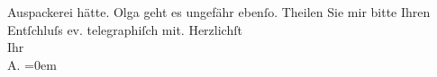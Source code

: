 \begin{ledgroupsized}[t]{13cm}
               Auspackerei hätte. Olga geht es ungefähr
               ebenſo.\pend
           \pstart
           Theilen Sie mir bitte Ihren {\pb}Entſchluſs ev.
               telegraphiſch mit.\pend
           \pstart
           Herzlichſt{\\[\baselineskip]}Ihr{\\[\baselineskip]}\spacefill\mbox{A.}\pend
           \leftskip=0em{}\endnumbering{}\end{ledgroupsized}  \newcommand{\dateiname}{L01442}\newcommand{\titel}{Arthur Schnitzler an Richard Beer-Hofmann, 10. 9. 1904}\newcommand{\editorInnen}{Martin Anton Müller und Gerd-Hermann Susen}
      